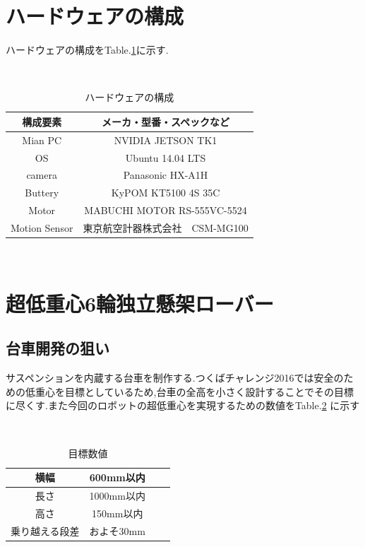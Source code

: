 \documentclass[a4paper]{jarticle}
\begin{document}
\section{ハードウェアの構成}
ハードウェアの構成をTable.\ref{tab:op}に示す.
\begin{table}[htbt]
 　\begin{center}
    \caption{ハードウェアの構成}
  \begin{tabular}{|c|c|} \hline
    構成要素 & メーカ・型番・スペックなど \\ \hline
    Mian PC & NVIDIA JETSON TK1 \\ \hline
    OS & Ubuntu 14.04 LTS \\ \hline
    camera & Panasonic HX-A1H \\ \hline
    Buttery & KyPOM KT5100 4S 35C \\ \hline
    Motor & MABUCHI MOTOR RS-555VC-5524 \\ \hline
    Motion Sensor & 東京航空計器株式会社　CSM-MG100\\ \hline

  \end{tabular}
　   \label{tab:op}
  \end{center}
\end{table}


\section{超低重心6輪独立懸架ローバー}
\subsection{台車開発の狙い}
サスペンションを内蔵する台車を制作する.つくばチャレンジ2016では安全のための低重心を目標としているため,台車の全高を小さく設計することでその目標に尽くす.また今回のロボットの超低重心を実現するための数値をTable.\ref{tab:joken} に示す
\begin{table}[htbt]
 　\begin{center}
    \caption{目標数値}
  \begin{tabular}{|c|c|c|c|} \hline
横幅 & 600mm以内  \\  \hline
長さ & 1000mm以内\\ \hline
高さ & 150mm以内 \\ \hline
    乗り越える段差 & およそ30mm  \\ \hline
  \end{tabular}
　   \label{tab:joken}
  \end{center}
\end{table}
\end{document}

